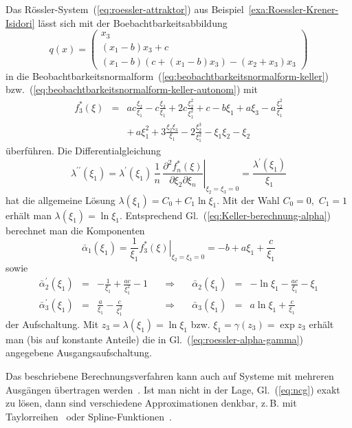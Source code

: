 \begin{example}
Das Rössler-System~(\ref{eq:roessler-attraktor}) aus Beispiel~\ref{exa:Roessler-Krener-Isidori}
lässt sich mit der Boebachtbarkeitsabbildung
\[
q(x)=\left(\begin{array}{c}
x_{3}\\
(x_{1}-b)x_{3}+c\\
(x_{1}-b)\left(c+(x_{1}-b)x_{3}\right)-(x_{2}+x_{3})x_{3}
\end{array}\right)
\]
in die Beobachtbarkeitsnormalform~(\ref{eq:beobachtbarkeitsnormalform-keller})
bzw.~(\ref{eq:beobachtbarkeitsnormalform-keller-autonom}) mit
\[
\begin{array}{ccl}
f_{3}^{*}(\xi) & = & ac\frac{\xi_{2}}{\xi_{1}}-c\frac{\xi_{3}}{\xi_{1}}+2c\frac{\xi_{2}^{2}}{\xi_{1}^{2}}+c-b\xi_{1}+a\xi_{3}-a\frac{\xi_{2}^{2}}{\xi_{1}}\\
 &  & +\,a\xi_{1}^{2}+3\frac{\xi_{2}\xi_{3}}{\xi_{1}}-2\frac{\xi_{2}^{3}}{\xi_{1}^{2}}-\xi_{1}\xi_{2}-\xi_{2}
\end{array}
\]
überführen. Die Differentialgleichung 
\[
\lambda^{\prime\prime}(\xi_{1})=\lambda^{\prime}(\xi_{1})\,\frac{1}{n}\,\left.\frac{\partial^{2}f_{n}^{*}(\xi)}{\partial\xi_{2}\partial\xi_{n}}\right|_{\xi_{2}=\xi_{3}=0}=\frac{\lambda^{\prime}(\xi_{1})}{\xi_{1}}
\]
hat die allgemeine Lösung $\lambda(\xi_{1})=C_{0}+C_{1}\ln\xi_{1}$.
Mit der Wahl $C_{0}=0,$ $C_{1}=1$ erhält man $\lambda(\xi_{1})=\ln\xi_{1}$.
Entsprechend Gl.~(\ref{eq:Keller-berechnung-alpha}) berechnet man
die Komponenten
\[
\bar{\alpha}_{1}(\xi_{1})=\frac{1}{\xi_{1}}\left.f_{3}^{*}(\xi)\right|_{\xi_{2}=\xi_{3}=0}=-b+a\xi_{1}+\frac{c}{\xi_{1}}
\]
sowie
\[
\begin{array}{lclclcl}
\bar{\alpha}_{2}^{\prime}(\xi_{1}) & = & -\frac{1}{\xi_{1}}+\frac{ac}{\xi_{1}^{2}}-1 & \quad\Rightarrow\quad & \bar{\alpha}_{2}(\xi_{1}) & = & -\ln\xi_{1}-\frac{ac}{\xi_{1}}-\xi_{1}\\
\bar{\alpha}_{3}^{\prime}(\xi_{1}) & = & \frac{a}{\xi_{1}}-\frac{c}{\xi_{1}^{2}} & \quad\Rightarrow\quad & \bar{\alpha}_{3}(\xi_{1}) & = & a\ln\xi_{1}+\frac{c}{\xi_{1}}
\end{array}
\]
der Aufschaltung. Mit $z_{3}=\lambda(\xi_{1})=\ln\xi_{1}$ bzw. $\xi_{1}=\gamma(z_{3})=\exp z_{3}$
erhält man (bis auf konstante Anteile) die in Gl.~(\ref{eq:roessler-alpha-gamma})
angegebene Ausgangsaufschaltung.
\end{example}

\begin{remark}
Das beschriebene Berechnungsverfahren kann auch auf Systeme mit mehreren
Ausgängen übertragen werden~\cite{keller86diss,phelps1988,phelps1991}.
Ist man nicht in der Lage, Gl.~(\ref{eq:ncg}) exakt zu lösen, dann
sind verschiedene Approximationen denkbar, z.\,B. mit Taylorreihen~\cite{jelali1995}
oder Spline-Funktionen~\cite{bortoff95,lynch97scl}.
\end{remark}

